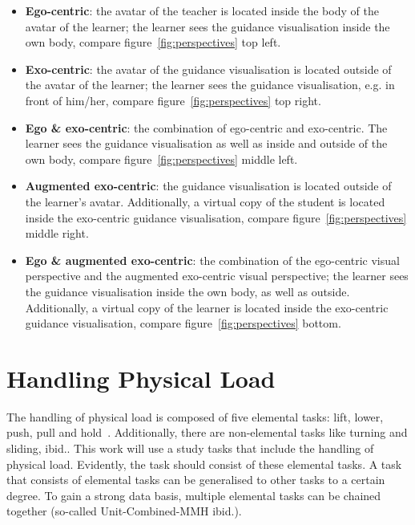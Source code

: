 \begin{itemize}
	\item \textbf{Ego-centric}: the avatar of the teacher is located inside the body of the avatar of the learner; the learner sees the guidance visualisation inside the own body, compare figure~\ref{fig:perspectives} top left.
	\item \textbf{Exo-centric}: the avatar of the guidance visualisation is located outside of the avatar of the learner; the learner sees the guidance visualisation, e.g. in front of him/her, compare figure~\ref{fig:perspectives} top right.
	\item \textbf{Ego \& exo-centric}: the combination of ego-centric and exo-centric. The learner sees the guidance visualisation as well as inside and outside of the own body, compare figure~\ref{fig:perspectives} middle left.
	\item \textbf{Augmented exo-centric}: the guidance visualisation is located outside of the learner's avatar. Additionally, a virtual copy of the student is located inside the exo-centric guidance visualisation, compare figure~\ref{fig:perspectives} middle right.
	\item \textbf{Ego \& augmented exo-centric}: the combination of the ego-centric visual perspective and the augmented exo-centric visual perspective; the learner sees the guidance visualisation inside the own body, as well as outside. Additionally, a virtual copy of the learner is located inside the exo-centric guidance visualisation, compare figure~\ref{fig:perspectives} bottom.	
\end{itemize}

\section{Handling Physical Load}
\label{handlingphysicalload}
The handling of physical load is composed of five elemental tasks: lift, lower, push, pull and hold~\cite{mmh}. Additionally, there are non-elemental tasks like turning and sliding, ibid.. This work will use a study tasks that include the handling of physical load. Evidently, the task should consist of these elemental tasks. A task that consists of elemental tasks can be generalised to other tasks to a certain degree. To gain a strong data basis, multiple elemental tasks can be chained together (so-called Unit-Combined-MMH ibid.). 



